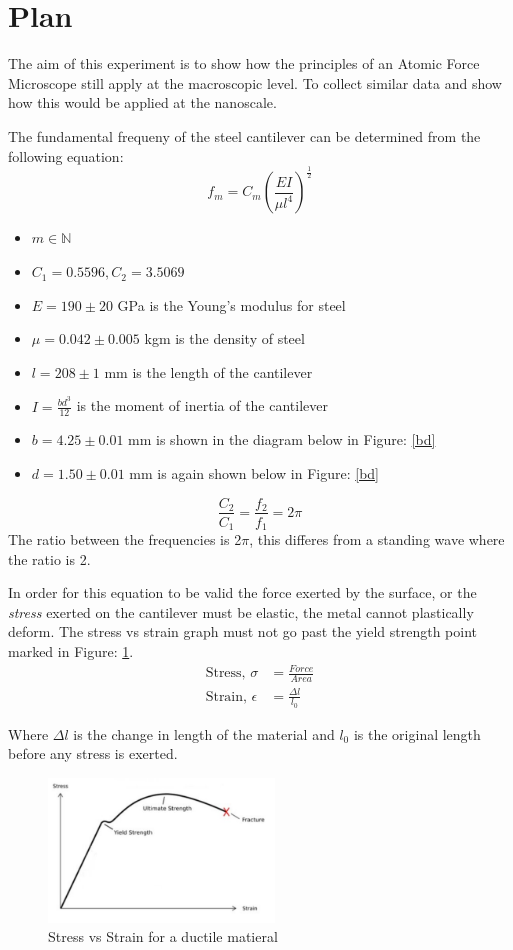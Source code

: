 \documentclass{article}
\begin{document}
\section*{Plan}

The aim of this experiment is to show how the principles of an Atomic Force Microscope still apply at the 
macroscopic level. To collect similar data and show how this would be applied at the nanoscale. 

The fundamental frequeny of the steel cantilever can be determined from the following equation:
$$f_m = C_m\left(\frac{EI}{\mu l^4}\right)^{\frac{1}{2}}$$
\begin{itemize}
    \item $m \in \mathbb{N}$
    \item $C_1 = 0.5596, C_2 = 3.5069$
    \item $E = 190 \pm 20$ GPa is the Young's modulus for steel
    \item $\mu = 0.042 \pm 0.005$ kgm is the density of steel
    \item $l = 208 \pm 1$ mm is the length of the cantilever
    \item $I = \frac{bd^3}{12}$ is the moment of inertia of the cantilever
    \item $b = 4.25 \pm 0.01$ mm is shown in the diagram below in Figure: \ref{bd}
    \item $d = 1.50 \pm 0.01$ mm is again shown below in Figure: \ref{bd}
\end{itemize}

$$\frac{C_2}{C_1} = \frac{f_2}{f_1} = 2\pi$$
The ratio between the frequencies is 2$\pi$, this differes from a standing wave where the ratio is 2.

In order for this equation to be valid the force exerted by the surface, or the \emph{stress} exerted on the 
cantilever must be elastic, the metal cannot plastically deform. The stress vs strain graph must not 
go past the yield strength point marked in Figure: \ref{young}. 
\begin{align*}
    \text{Stress,\ } \sigma &= \frac{Force}{Area}\\
    \text{Strain,\ } \epsilon &= \frac{\Delta l}{l_0}
\end{align*}

Where $\Delta l$ is the change in length of the material and $l_0$ is the original length before any stress is 
exerted.

\begin{figure}[h]
    \centering
    \captionsetup{justification=centering}
    \includegraphics[width=6cm]{young.jpg}
    \caption{Stress vs Strain for a ductile matieral \label{young}}
\end{figure}
\end{document}
